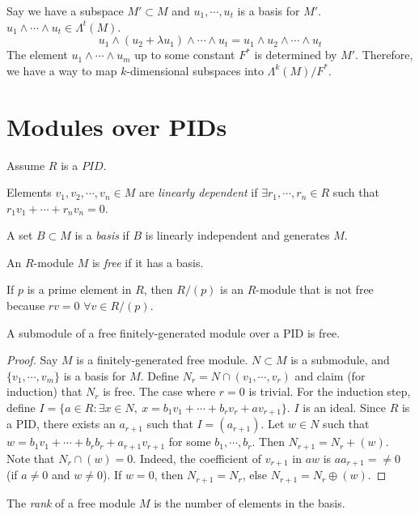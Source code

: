 \documentclass[a4paper,twoside,master.tex]{subfiles}
\begin{document}
Say we have a subspace $ M' \subset M $ and $ u_1,\cdots,u_t $ is a basis for $ M' $. $ u_1\wedge \cdots\wedge u_t \in \Lambda^t(M) $.
\begin{equation}
    u_1 \wedge (u_2 + \lambda u_1) \wedge \cdots \wedge u_t = u_1 \wedge u_2 \wedge \cdots \wedge u_t
\end{equation}
The element $ u_1 \wedge \cdots \wedge u_m $ up to some constant $ F^* $ is determined by $ M' $. Therefore, we have a way to map $ k $-dimensional subspaces into $ \Lambda^k(M) / F^* $.

\section{Modules over PIDs}\label{sec:modules_over_pids}

Assume $ R $ is a $ PID $.

\begin{definition}
    Elements $ v_1, v_2, \cdots, v_n \in M $ are \textit{linearly dependent} if $ \exists r_1, \cdots, r_n \in R $ such that $ r_1 v_1 + \cdots + r_n v_n = 0 $.
\end{definition}
\begin{definition}
    A set $ B \subset M $ is a \textit{basis} if $ B $ is linearly independent and generates $ M $.
\end{definition}
\begin{definition}
    An $ R $-module $ M $ is \textit{free} if it has a basis.
\end{definition}
\begin{ex}
    If $ p $ is a prime element in $ R $, then $ R / (p) $ is an $ R $-module that is not free because $ rv = 0 $ $ \forall v \in R / (p) $. 
\end{ex}
\begin{claim}
    A submodule of a free finitely-generated module over a PID is free.
\end{claim}
\begin{proof}
    Say $ M $ is a finitely-generated free module. $ N \subset M $ is a submodule, and $ \{v_1, \cdots, v_m\} $ is a basis for $ M $. Define $ N_r = N \cap (v_1, \cdots, v_r) $ and claim (for induction) that $ N_r $ is free. The case where $ r = 0 $ is trivial. For the induction step, define $ I = \{a \in R \colon \exists x \in N,\ x = b_1 v_1 + \cdots + b_r v_r + a v_{r+1}\} $. $ I $ is an ideal. Since $ R $ is a PID, there exists an $ a_{r+1} $ such that $ I = (a_{r+1}) $. Let $ w \in N $ such that $ w = b_1 v_1 + \cdots + b_r b_r + a_{r+1} v_{r+1} $ for some $ b_1, \cdots, b_r $. Then $ N_{r+1} = N_r + (w) $. Note that $ N_r \cap (w) = 0 $. Indeed, the coefficient of $ v_{r+1} $ in $ aw $ is $ a a_{r+1} = \neq 0 $ (if $ a \neq 0 $ and $ w \neq 0 $). If $ w = 0 $, then $ N_{r+1} = N_r $, else $ N_{r+1} = N_r \oplus (w) $.
\end{proof}

\begin{definition}
    The \textit{rank} of a free module $ M $ is the number of elements in the basis.
\end{definition}
\end{document}
